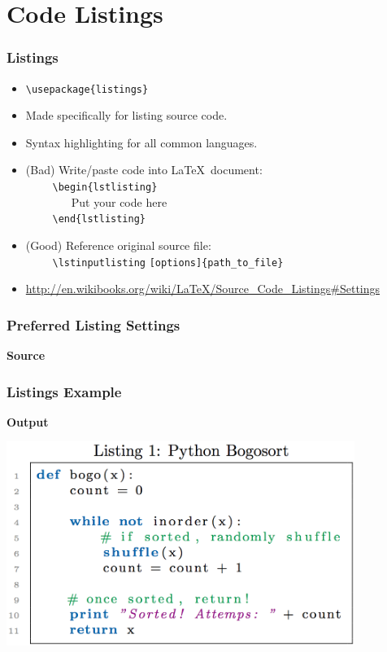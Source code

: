 \documentclass{beamer}
\newcommand{\codeframe}[4]
{
    \begin{frame} \frametitle{#1}
        \begin{columns}[T]
            \column{.52\textwidth}
                \textbf{Source}
                
            \column{.46\textwidth}
                \textbf{Output}
                \fbox{\texttt{[image: Examples/\#2.png]}}
        \end{columns}
    \end{frame}
}
\newcommand{\pc}[1]
{
    \texttt{\textbackslash #1}
}
\newcommand{\pca}[2]
{
    \texttt{\textbackslash #1\{#2\}}
}
\begin{document}
\section{Code Listings}
    \begin{frame}
    \frametitle{Listings}
    \begin{itemize}
    	\item \pca{usepackage}{listings}
        \item Made specifically for listing source code. 
        \item Syntax highlighting for all common languages.
        \item (Bad) Write/paste code into \LaTeX\ document: \\
        \ \ \ \ \pca{begin}{lstlisting}\\ \ \ \ \ \ \ \ \ Put your code here\\ \ \ \ \ \pca{end}{lstlisting}
        \item (Good) Reference original source file: \\
        \ \ \ \ \pc{lstinputlisting}\texttt{[options]\{path\_to\_file\}}
        \item \url{http://en.wikibooks.org/wiki/LaTeX/Source\_Code\_Listings\#Settings}
    \end{itemize}
\end{frame}

\begin{frame} \frametitle{Preferred Listing Settings}
    \textbf{Source}\\
    
\end{frame}

\begin{frame} \frametitle{Listings Example}
	\textbf{Output}\\
	\begin{center}
	\includegraphics[width=0.85\textwidth]{Examples/9-listings.png}
	\end{center}
\end{frame}
\end{document}
